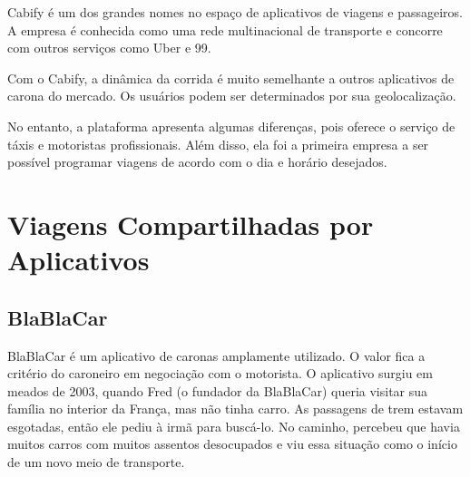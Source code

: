 Cabify é um dos grandes nomes no espaço de aplicativos de viagens e passageiros. A empresa é conhecida como uma rede multinacional de transporte e concorre com outros serviços como Uber e 99.

Com o Cabify, a dinâmica da corrida é muito semelhante a outros aplicativos de carona do mercado. Os usuários podem ser determinados por sua geolocalização.

No entanto, a plataforma apresenta algumas diferenças, pois oferece o serviço de táxis e motoristas profissionais. Além disso, ela foi a primeira empresa a ser possível programar viagens de acordo com o dia e horário desejados.%


\section{Viagens Compartilhadas por Aplicativos}
\subsection{BlaBlaCar}

BlaBlaCar é um aplicativo de caronas amplamente utilizado. O valor fica a critério do caroneiro em negociação com o motorista. O aplicativo surgiu em meados de 2003, quando Fred (o fundador da BlaBlaCar) queria visitar sua família no interior da França, mas não tinha carro. As passagens de trem estavam esgotadas, então ele pediu à irmã para buscá-lo. No caminho, percebeu que havia muitos carros com muitos assentos desocupados e viu essa situação como o início de um novo meio de transporte.

